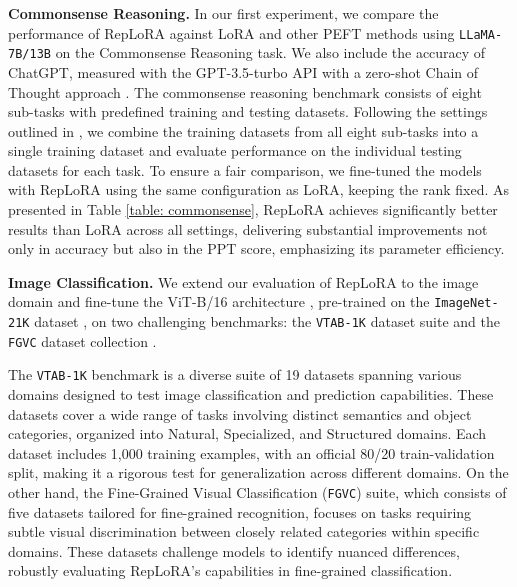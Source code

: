 

\vspace{0.5 em}
\noindent
\textbf{Commonsense Reasoning. } In our first experiment, we compare the performance of RepLoRA against LoRA and other PEFT methods using \texttt{LLaMA-7B/13B} \cite{llama} on the Commonsense Reasoning task. We also include the accuracy of ChatGPT, measured with the GPT-3.5-turbo API with a zero-shot Chain of Thought approach \cite{chatgpt}. The commonsense reasoning benchmark consists of eight sub-tasks with predefined training and testing datasets. Following the settings outlined in \cite{commonsensesettings}, we combine the training datasets from all eight sub-tasks into a single training dataset and evaluate performance on the individual testing datasets for each task. To ensure a fair comparison, we fine-tuned the models with RepLoRA using the same configuration as LoRA, keeping the rank fixed. As presented in Table \ref{table: commonsense}, RepLoRA achieves significantly better results than LoRA across all settings, delivering substantial improvements not only in accuracy but also in the PPT score, emphasizing its parameter efficiency.

\vspace{0.5 em}
\noindent
\textbf{Image Classification.} We extend our evaluation of RepLoRA to the image domain and fine-tune the ViT-B/16 architecture \cite{dosovitskiy2020image}, pre-trained on the \texttt{ImageNet-21K} dataset \cite{imagenet}, on two challenging benchmarks: the \texttt{VTAB-1K} dataset suite \cite{vtab} and the \texttt{FGVC} dataset collection \cite{jia2022visual}.

The \texttt{VTAB-1K} benchmark is a diverse suite of 19 datasets spanning various domains designed to test image classification and prediction capabilities. These datasets cover a wide range of tasks involving distinct semantics and object categories, organized into Natural, Specialized, and Structured domains. Each dataset includes 1,000 training examples, with an official 80/20 train-validation split, making it a rigorous test for generalization across different domains. On the other hand, the Fine-Grained Visual Classification (\texttt{FGVC}) suite, which consists of five datasets tailored for fine-grained recognition, focuses on tasks requiring subtle visual discrimination between closely related categories within specific domains. These datasets challenge models to identify nuanced differences, robustly evaluating RepLoRA’s capabilities in fine-grained classification.



